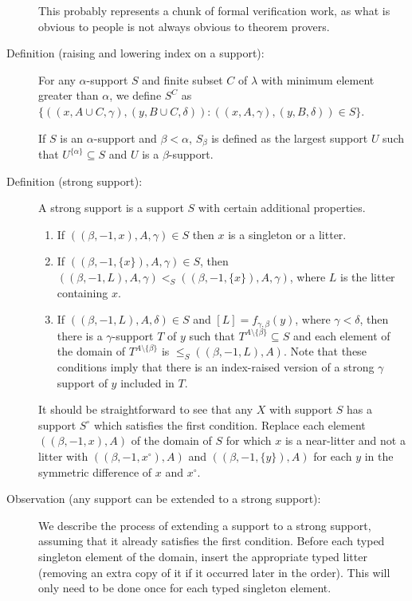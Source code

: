 \begin{description}
This probably represents a chunk of formal verification work, as what is obvious to people is not always obvious to theorem provers.

\item[Definition (raising and lowering index on a support):]  For any $\alpha$-support $S$ and finite subset $C$ of $\lambda$ with minimum element greater than $\alpha$, we define $S^C$ as
$\{((x,A\cup C,\gamma),(y,B\cup C,\delta)):((x,A,\gamma),(y,B,\delta)) \in S\}$.

If $S$ is an $\alpha$-support and $\beta<\alpha$, $S_\beta$ is defined as the largest support $U$ such that $U^{\{\alpha\}} \subseteq S$ and $U$ is a $\beta$-support.

\item[Definition (strong support):]  A strong support is a support $S$ with certain additional properties.

\begin{enumerate}

\item  If $((\beta,-1,x),A,\gamma) \in S$ then $x$ is a singleton or a litter.

\item  If $((\beta,-1,\{x\}),A,\gamma) \in S$, then $((\beta,-1,L),A,\gamma) <_S ((\beta,-1,\{x\}),A,\gamma)$, where $L$ is the litter containing $x$.

\item  If $((\beta,-1,L),A,\delta) \in S$ and $[L]=f_{\gamma,\beta}(y)$, where $\gamma<\delta$, then there is a $\gamma$-support $T$ of $y$ such that $T^{A \setminus \{\beta\}} \subseteq S$ and each element of the domain of $T^{A \setminus \{\beta\}}$ is $\leq_S ((\beta,-1,L),A)$.  Note that these conditions imply that there is an index-raised version of a strong $\gamma$ support of $y$ included in $T$.

\end{enumerate}

It should be straightforward to see that any $X$ with support $S$ has a support $S^\circ$ which satisfies the first condition.  Replace each
element $((\beta,-1,x),A)$ of the domain of $S$ for which $x$ is a near-litter and not a litter with $((\beta,-1,x^\circ),A)$ and $((\beta,-1,\{y\}),A)$ for each $y$ in the symmetric difference of $x$ and $x^\circ$.

\item[Observation (any support can be extended to a strong support):]  We describe the process of extending a support to a strong support, assuming that it already satisfies the first condition.  Before each typed singleton element of the domain, insert the appropriate typed litter (removing an extra copy of it if it occurred later in the order).  This will only need to be done once for each typed singleton element.


\end{description}
